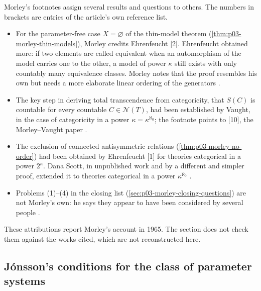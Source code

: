 Morley's footnotes assign several results and questions to others. The
numbers in brackets are entries of the article's own reference list.
\begin{itemize}
\item For the parameter-free case \(X=\varnothing\) of the thin-model
theorem (\cref{thm:p03-morley-thin-models}), Morley credits Ehrenfeucht
[2]. Ehrenfeucht obtained more: if two elements are called equivalent
when an automorphism of the model carries one to the other, a model of
power \(\kappa\) still exists with only countably many equivalence
classes. Morley notes that the proof resembles his own but needs a more
elaborate linear ordering of the generators
\cite[p.~528, n.~16]{Morley1965}.
\item The key step in deriving total transcendence from categoricity,
that \(S(C)\) is countable for every countable \(C\in\mathcal N(T)\),
had been established by Vaught, in the case of categoricity in a power
\(\kappa=\kappa^{\aleph_0}\); the footnote points to [10], the
Morley--Vaught paper \cite[p.~528, n.~17]{Morley1965}.
\item The exclusion of connected antisymmetric relations
(\cref{thm:p03-morley-no-order}) had been obtained by Ehrenfeucht [1]
for theories categorical in a power \(2^\kappa\). Dana Scott, in
unpublished work and by a different and simpler proof, extended it to
theories categorical in a power \(\kappa^{\aleph_0}\)
\cite[p.~528, n.~18]{Morley1965}.
\item Problems (1)--(4) in the closing list (\cref{sec:p03-morley-closing-questions})
are not Morley's own: he says they appear to have been considered by
several people \cite[p.~537, n.~25]{Morley1965}.
\end{itemize}

These attributions report Morley's account in 1965. The section does not
check them against the works cited, which are not reconstructed here.

\subsection{Jónsson's conditions for the class of parameter systems}
\label{sec:p03-w03-p03-033-jonsson-conditions}


